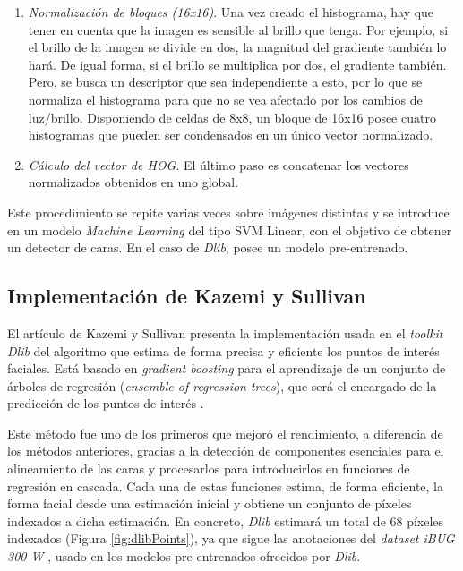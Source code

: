 \begin{enumerate}
	\item \textit{Normalización de bloques (16x16)}. Una vez creado el histograma, hay que tener en cuenta que la imagen es sensible al brillo que tenga. Por ejemplo, si el brillo de la imagen se divide en dos, la magnitud del gradiente también lo hará. De igual forma, si el brillo se multiplica por dos, el gradiente también. Pero, se busca un descriptor que sea independiente a esto, por lo que se normaliza el histograma para que no se vea afectado por los cambios de luz/brillo.	Disponiendo de celdas de 8x8, un bloque de 16x16 posee cuatro histogramas que pueden ser condensados en un único vector normalizado.
	
	\item \textit{Cálculo del vector de HOG}. El último paso es concatenar los vectores normalizados obtenidos en uno global.

\end{enumerate}

Este procedimiento se repite varias veces sobre imágenes distintas y se introduce en un modelo \textit{Machine Learning} del tipo SVM Linear, con el objetivo de obtener un detector de caras. En el caso de \textit{Dlib}, posee un modelo pre-entrenado.

\vspace{-0.7cm}
\subsection*{Implementación de Kazemi y Sullivan}
\vspace{-0.5cm}
El artículo de Kazemi y Sullivan presenta la implementación usada en el \textit{toolkit Dlib} del algoritmo que estima de forma precisa y eficiente los puntos de interés faciales. Está basado en \textit{gradient boosting} para el aprendizaje de un conjunto de árboles de regresión (\textit{ensemble of regression trees}), que será el encargado de la predicción de los puntos de interés \cite{faceLandmark}.

Este método fue uno de los primeros que mejoró el rendimiento, a diferencia de los métodos anteriores, gracias a la detección de componentes esenciales para el alineamiento de las caras y procesarlos para introducirlos en funciones de regresión en cascada. Cada una de estas funciones estima, de forma eficiente, la forma facial desde una estimación inicial y obtiene un conjunto de píxeles indexados a dicha estimación. En concreto, \textit{Dlib} estimará un total de 68 píxeles indexados (Figura \ref{fig:dlibPoints}), ya que sigue las anotaciones del \textit{dataset iBUG 300-W} \cite{ibug}, usado en los modelos pre-entrenados ofrecidos por \textit{Dlib}.

